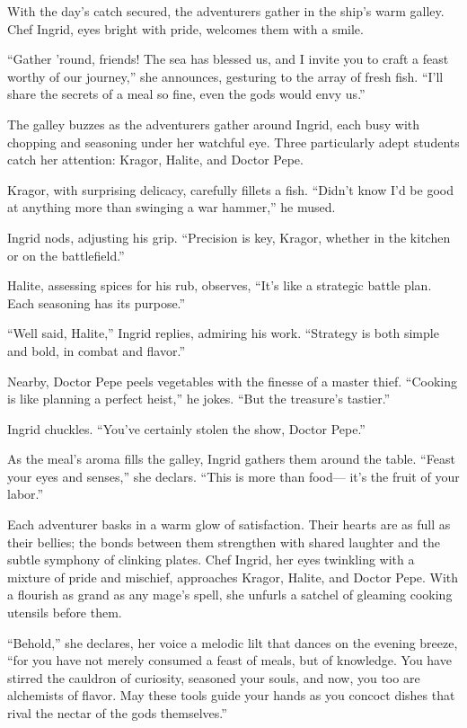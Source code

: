 \documentclass[
  letterpaper,12pt,twoside,twocolumn,openany,
  nodeprecatedcode,bg=full]{dndbook}
\begin{document}
With the day's catch secured, the adventurers gather in the ship's warm
galley. Chef Ingrid, eyes bright with pride, welcomes them with a smile.

``Gather 'round, friends! The sea has blessed us, and I invite you to
craft a feast worthy of our journey,'' she announces, gesturing to the
array of fresh fish. ``I'll share the secrets of a meal so fine, even
the gods would envy us.''

The galley buzzes as the adventurers gather around Ingrid, each busy
with chopping and seasoning under her watchful eye. Three particularly
adept students catch her attention: Kragor, Halite, and Doctor Pepe.

Kragor, with surprising delicacy, carefully fillets a fish. ``Didn't
know I'd be good at anything more than swinging a war hammer,'' he
mused.

Ingrid nods, adjusting his grip. ``Precision is key, Kragor, whether in
the kitchen or on the battlefield.''

Halite, assessing spices for his rub, observes, ``It's like a strategic
battle plan. Each seasoning has its purpose.''

``Well said, Halite,'' Ingrid replies, admiring his work. ``Strategy is
both simple and bold, in combat and flavor.''

Nearby, Doctor Pepe peels vegetables with the finesse of a master thief.
``Cooking is like planning a perfect heist,'' he jokes. ``But the
treasure's tastier.''

Ingrid chuckles. ``You've certainly stolen the show, Doctor Pepe.''

As the meal's aroma fills the galley, Ingrid gathers them around the
table. ``Feast your eyes and senses,'' she declars. ``This is more than
food--- it's the fruit of your labor.''

Each adventurer basks in a warm glow of satisfaction. Their hearts are
as full as their bellies; the bonds between them strengthen with shared
laughter and the subtle symphony of clinking plates. Chef Ingrid, her
eyes twinkling with a mixture of pride and mischief, approaches Kragor,
Halite, and Doctor Pepe. With a flourish as grand as any mage's spell,
she unfurls a satchel of gleaming cooking utensils before them.

``Behold,'' she declares, her voice a melodic lilt that dances on the
evening breeze, ``for you have not merely consumed a feast of meals, but
of knowledge. You have stirred the cauldron of curiosity, seasoned your
souls, and now, you too are alchemists of flavor. May these tools guide
your hands as you concoct dishes that rival the nectar of the gods
themselves.''
\end{document}
